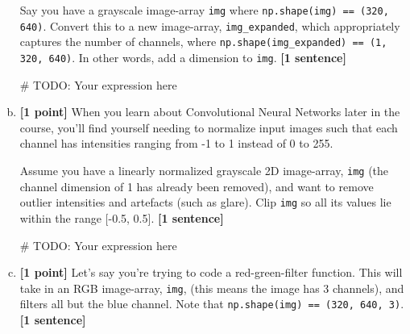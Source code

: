 \documentclass[11pt]{article}
\begin{document}
\begin{enumerate}[(a)]
    \begin{tcolorbox}[colback=orange!5!white,colframe=orange!75!black]
    Say you have a grayscale image-array \texttt{img} where \texttt{np.shape(img) == (320, 640)}. Convert this to a new image-array, \texttt{img\_expanded}, which appropriately captures the number of channels, where \texttt{np.shape(img\_expanded) == (1, 320, 640)}. In other words, add a dimension to \texttt{img}. \textbf{[1 sentence]}
    \end{tcolorbox}

\begin{tcolorbox}[colback=white!5!white,colframe=green!75!black,height=2cm]
    \begin{python}
    # TODO: Your expression here
    \end{python}
    \end{tcolorbox}
    
    \item \textbf{[1 point]} When you learn about Convolutional Neural Networks later in the course, you'll find yourself needing to normalize input images such that each channel has intensities ranging from -1 to 1 instead of 0 to 255.
    
    \begin{tcolorbox}[colback=orange!5!white,colframe=orange!75!black]
    Assume you have a linearly normalized grayscale 2D image-array, \texttt{img} (the channel dimension of 1 has already been removed), and want to remove outlier intensities and artefacts (such as glare). Clip \texttt{img} so all its values lie within the range [-0.5, 0.5]. \textbf{[1 sentence]}
    \end{tcolorbox}

\begin{tcolorbox}[colback=white!5!white,colframe=green!75!black,height=2cm]
    \begin{python}
    # TODO: Your expression here
    \end{python}
    \end{tcolorbox}
    
    \item \textbf{[1 point]} Let's say you're trying to code a red-green-filter function. This will take in an RGB image-array, \texttt{img}, (this means the image has 3 channels), and filters all but the blue channel. Note that \texttt{np.shape(img) == (320, 640, 3)}. \textbf{[1 sentence]}
    

\end{enumerate}
\end{document}
